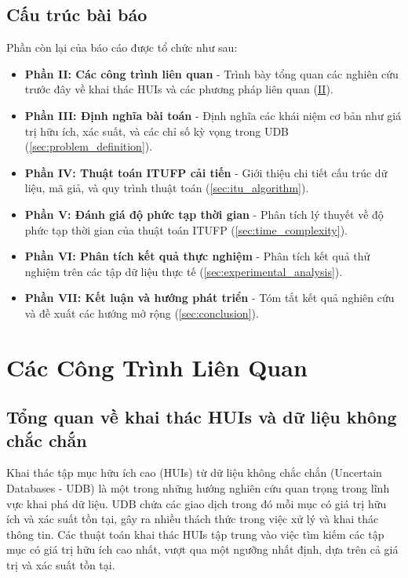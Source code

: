 \documentclass[conference]{IEEEtran}
\begin{document}
\subsection{Cấu trúc bài báo}
Phần còn lại của báo cáo được tổ chức như sau:
\begin{itemize}
    \item \textbf{Phần II: Các công trình liên quan} - Trình bày tổng quan các nghiên cứu trước đây về khai thác HUIs và các phương pháp liên quan (\hyperref[sec:related_work]{II}).
    \item \textbf{Phần III: Định nghĩa bài toán} - Định nghĩa các khái niệm cơ bản như giá trị hữu ích, xác suất, và các chỉ số kỳ vọng trong UDB (\ref{sec:problem_definition}).
    \item \textbf{Phần IV: Thuật toán ITUFP cải tiến} - Giới thiệu chi tiết cấu trúc dữ liệu, mã giả, và quy trình thuật toán (\ref{sec:itu_algorithm}).
    \item \textbf{Phần V: Đánh giá độ phức tạp thời gian} - Phân tích lý thuyết về độ phức tạp thời gian của thuật toán ITUFP (\ref{sec:time_complexity}).
    \item \textbf{Phần VI: Phân tích kết quả thực nghiệm} - Phân tích kết quả thử nghiệm trên các tập dữ liệu thực tế (\ref{sec:experimental_analysis}).
    \item \textbf{Phần VII: Kết luận và hướng phát triển} - Tóm tắt kết quả nghiên cứu và đề xuất các hướng mở rộng (\ref{sec:conclusion}).
\end{itemize}

\section{Các Công Trình Liên Quan}
\label{sec:related_work}

\subsection{Tổng quan về khai thác HUIs và dữ liệu không chắc chắn}
Khai thác tập mục hữu ích cao (HUIs) từ dữ liệu không chắc chắn (Uncertain Databases - UDB) là một trong những hướng nghiên cứu quan trọng trong lĩnh vực khai phá dữ liệu. UDB chứa các giao dịch trong đó mỗi mục có giá trị hữu ích và xác suất tồn tại, gây ra nhiều thách thức trong việc xử lý và khai thác thông tin. Các thuật toán khai thác HUIs tập trung vào việc tìm kiếm các tập mục có giá trị hữu ích cao nhất, vượt qua một ngưỡng nhất định, dựa trên cả giá trị và xác suất tồn tại.
\end{document}
